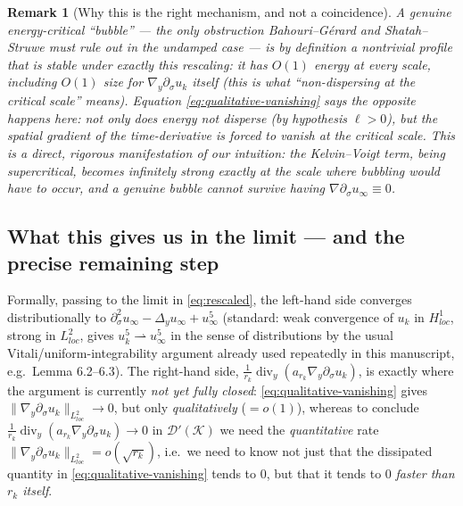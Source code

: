 \documentclass[11pt,letterpaper]{amsart}
\newtheorem{remark}[theorem]{Remark}
\newcommand{\dive}{\operatorname{div}}
\begin{document}
\begin{remark}[Why this is the right mechanism, and not a coincidence]
A genuine energy-critical ``bubble'' --- the only obstruction Bahouri--Gérard and Shatah--Struwe must rule out in the undamped case --- is by definition a nontrivial profile that is \emph{stable} under exactly this rescaling: it has $O(1)$ energy at every scale, including $O(1)$ size for $\nabla_y\partial_\sigma u_k$ itself (this is what ``non-dispersing at the critical scale'' means). Equation \eqref{eq:qualitative-vanishing} says the opposite happens here: not only does energy not disperse (by hypothesis $\ell>0$), but the \emph{spatial gradient of the time-derivative is forced to vanish at the critical scale}. This is a direct, rigorous manifestation of our intuition: the Kelvin--Voigt term, being supercritical, becomes infinitely strong exactly at the scale where bubbling would have to occur, and a genuine bubble cannot survive having $\nabla\partial_\sigma u_\infty\equiv0$.
\end{remark}

\subsection{What this gives us in the limit --- and the precise remaining step}

Formally, passing to the limit in \eqref{eq:rescaled}, the left-hand side converges distributionally to $\partial_\sigma^2u_\infty - \Delta_yu_\infty + u_\infty^5$ (standard: weak convergence of $u_k$ in $H^1_{loc}$, strong in $L^2_{loc}$, gives $u_k^5\rightharpoonup u_\infty^5$ in the sense of distributions by the usual Vitali/uniform-integrability argument already used repeatedly in this manuscript, e.g.\ Lemma 6.2--6.3). The right-hand side, $\frac1{r_k}\dive_y(a_{r_k}\nabla_y\partial_\sigma u_k)$, is exactly where the argument is currently \emph{not yet fully closed}: \eqref{eq:qualitative-vanishing} gives $\|\nabla_y\partial_\sigma u_k\|_{L^2_{loc}} \to 0$, but only \emph{qualitatively} ($=o(1)$), whereas to conclude $\frac1{r_k}\dive_y(a_{r_k}\nabla_y\partial_\sigma u_k)\to0$ in $\mathcal D'(\mathcal K)$ we need the \emph{quantitative} rate $\|\nabla_y\partial_\sigma u_k\|_{L^2_{loc}} = o(\sqrt{r_k})$, i.e.\ we need to know not just that the dissipated quantity in \eqref{eq:qualitative-vanishing} tends to $0$, but that it tends to $0$ \emph{faster than $r_k$ itself}.



\end{document}
